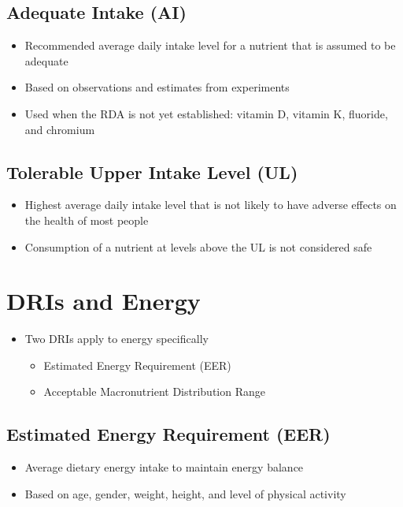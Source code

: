 \documentclass[title={Chapter 1}]{fdsn201notes}
\begin{document}
\subsection{Adequate Intake (AI)}\label{subsec:adequate-intake-(ai)}
\begin{itemize}
	\item Recommended average daily intake level for a nutrient that is assumed to be adequate
	\item Based on observations and estimates from experiments
	\item Used when the RDA is not yet established: vitamin D, vitamin K, fluoride, and chromium
\end{itemize}

\subsection{Tolerable Upper Intake Level (UL)}\label{subsec:tolerable-upper-intake-level-(ul)}
\begin{itemize}
	\item Highest average daily intake level that is not likely to have adverse effects on the health of most people
	\item Consumption of a nutrient at levels above the UL is not considered safe
\end{itemize}

\section{DRIs and Energy}\label{sec:dris-and-energy}
\begin{itemize}
	\item Two DRIs apply to energy specifically
	\begin{itemize}
		\item Estimated Energy Requirement (EER)
		\item Acceptable Macronutrient Distribution Range
	\end{itemize}
\end{itemize}

\subsection{Estimated Energy Requirement (EER)}\label{subsec:estimated-energy-requirement-(eer)}
\begin{itemize}
	\item Average dietary energy intake to maintain energy balance
	\item Based on age, gender, weight, height, and level of physical activity
\end{itemize}
\end{document}
